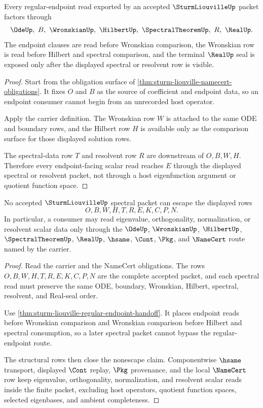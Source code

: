 \begin{theorem}
\label{thm:sturm-liouville-regular-endpoint-handoff}
Every regular-endpoint read exported by an accepted $\SturmLiouvilleUp$ packet factors through
$$
\OdeUp,\ B,\ \WronskianUp,\ \HilbertUp,\ \SpectralTheoremUp,\ R,\ \RealUp .
$$
The endpoint clauses are read before Wronskian comparison, the Wronskian row is read before Hilbert and spectral comparison, and the terminal $\RealUp$ seal is exposed only after the displayed spectral or resolvent row is visible.
\end{theorem}
\begin{proof}
Start from the obligation surface of \autoref{thm:sturm-liouville-namecert-obligations}. It fixes $O$ and $B$ as the source of coefficient and endpoint data, so an endpoint consumer cannot begin from an unrecorded host operator.

Apply the carrier definition. The Wronskian row $W$ is attached to the same ODE and boundary rows, and the Hilbert row $H$ is available only as the comparison surface for those displayed solution rows.

The spectral-data row $T$ and resolvent row $R$ are downstream of $O,B,W,H$. Therefore every endpoint-facing scalar read reaches $E$ through the displayed spectral or resolvent packet, not through a host eigenfunction argument or quotient function space.
\end{proof}

\begin{theorem}
\label{thm:sturm-liouville-spectral-packet-nonescape}
No accepted $\SturmLiouvilleUp$ spectral packet can escape the displayed rows
$$
O,B,W,H,T,R,E,K,C,P,N .
$$
In particular, a consumer may read eigenvalue, orthogonality, normalization, or resolvent scalar data only through the $\OdeUp$, $\WronskianUp$, $\HilbertUp$, $\SpectralTheoremUp$, $\RealUp$, $\hsame$, $\Cont$, $\Pkg$, and $\NameCert$ route named by the carrier.
\end{theorem}
\begin{proof}
Read the carrier and the NameCert obligations. The rows $O,B,W,H,T,R,E,K,C,P,N$ are the complete accepted packet, and each spectral read must preserve the same ODE, boundary, Wronskian, Hilbert, spectral, resolvent, and Real-seal order.

Use \autoref{thm:sturm-liouville-regular-endpoint-handoff}. It places endpoint reads before Wronskian comparison and Wronskian comparison before Hilbert and spectral consumption, so a later spectral packet cannot bypass the regular-endpoint route.

The structural rows then close the nonescape claim. Componentwise $\hsame$ transport, displayed $\Cont$ replay, $\Pkg$ provenance, and the local $\NameCert$ row keep eigenvalue, orthogonality, normalization, and resolvent scalar reads inside the finite packet, excluding host operators, quotient function spaces, selected eigenbases, and ambient completeness.
\end{proof}

